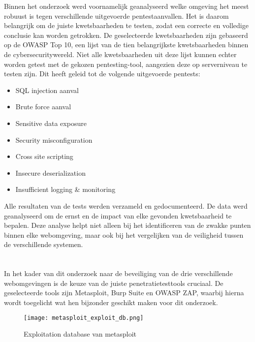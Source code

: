 Binnen het onderzoek werd voornamelijk geanalyseerd welke omgeving het meest robuust is tegen verschillende uitgevoerde pentestaanvallen. 
Het is daarom belangrijk om de juiste kwetsbaarheden te testen, zodat een correcte en volledige conclusie kan worden 
getrokken. De geselecteerde kwetsbaarheden zijn gebaseerd op de OWASP Top 10, een lijst van de tien belangrijkste 
kwetsbaarheden binnen de cybersecuritywereld. Niet alle kwetsbaarheden uit deze lijst kunnen echter worden getest met de 
gekozen pentesting-tool, aangezien deze op serverniveau te testen zijn. Dit heeft geleid tot de volgende uitgevoerde pentests:

\begin{itemize}
    \item SQL injection aanval
    \item Brute force aanval
    \item Sensitive data exposure
    \item Security misconfiguration
    \item Cross site scripting
    \item Insecure deserialization
    \item Insufficient logging \& monitoring 
\end{itemize}

Alle resultaten van de tests werden verzameld en gedocumenteerd. De data werd geanalyseerd 
om de ernst en de impact van elke gevonden kwetsbaarheid te bepalen. Deze analyse helpt niet alleen bij 
het identificeren van de zwakke punten binnen elke webomgeving, maar ook bij het vergelijken van de 
veiligheid tussen de verschillende systemen.

\section{}
In het kader van dit onderzoek naar de beveiliging van de drie verschillende webomgevingen is de keuze van 
de juiste penetratietesttools cruciaal. De geselecteerde tools zijn 
Metasploit, Burp Suite en OWASP ZAP, waarbij hierna wordt toegelicht wat hen bijzonder geschikt maken voor dit onderzoek.
\begin{figure}
    \centering
    \texttt{[image: metasploit\_exploit\_db.png]}
    \caption[Exploitation database van metasploit]{Exploitation database van metasploit}
    \label{fig:exploitatie_db}
\end{figure}
